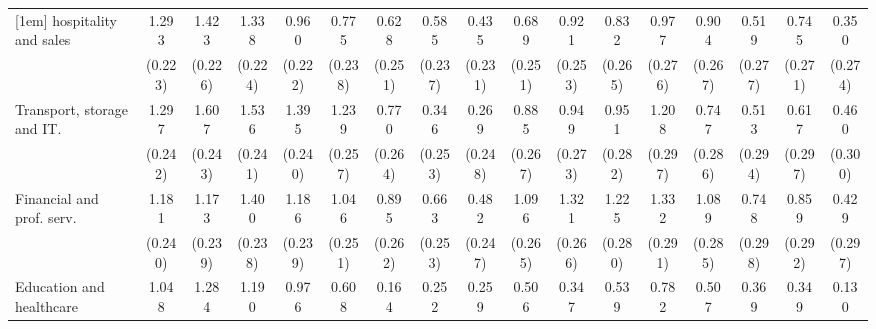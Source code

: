 {\begin{tabular}{l*{16}{c}}
[1em]
hospitality and sales&       1.293\sym{***}&       1.423\sym{***}&       1.338\sym{***}&       0.960\sym{***}&       0.775\sym{**} &       0.628\sym{*}  &       0.585\sym{*}  &       0.435         &       0.689\sym{**} &       0.921\sym{***}&       0.832\sym{**} &       0.977\sym{***}&       0.904\sym{***}&       0.519         &       0.745\sym{**} &       0.350         \\
                    &     (0.223)         &     (0.226)         &     (0.224)         &     (0.222)         &     (0.238)         &     (0.251)         &     (0.237)         &     (0.231)         &     (0.251)         &     (0.253)         &     (0.265)         &     (0.276)         &     (0.267)         &     (0.277)         &     (0.271)         &     (0.274)         \\
[1em]
Transport, storage and IT.&       1.297\sym{***}&       1.607\sym{***}&       1.536\sym{***}&       1.395\sym{***}&       1.239\sym{***}&       0.770\sym{**} &       0.346         &       0.269         &       0.885\sym{***}&       0.949\sym{***}&       0.951\sym{***}&       1.208\sym{***}&       0.747\sym{**} &       0.513         &       0.617\sym{*}  &       0.460         \\
                    &     (0.242)         &     (0.243)         &     (0.241)         &     (0.240)         &     (0.257)         &     (0.264)         &     (0.253)         &     (0.248)         &     (0.267)         &     (0.273)         &     (0.282)         &     (0.297)         &     (0.286)         &     (0.294)         &     (0.297)         &     (0.300)         \\
[1em]
Financial and prof. serv.&       1.181\sym{***}&       1.173\sym{***}&       1.400\sym{***}&       1.186\sym{***}&       1.046\sym{***}&       0.895\sym{***}&       0.663\sym{**} &       0.482         &       1.096\sym{***}&       1.321\sym{***}&       1.225\sym{***}&       1.332\sym{***}&       1.089\sym{***}&       0.748\sym{*}  &       0.859\sym{**} &       0.429         \\
                    &     (0.240)         &     (0.239)         &     (0.238)         &     (0.239)         &     (0.251)         &     (0.262)         &     (0.253)         &     (0.247)         &     (0.265)         &     (0.266)         &     (0.280)         &     (0.291)         &     (0.285)         &     (0.298)         &     (0.292)         &     (0.297)         \\
[1em]
Education and healthcare&       1.048\sym{***}&       1.284\sym{***}&       1.190\sym{***}&       0.976\sym{***}&       0.608\sym{*}  &       0.164         &       0.252         &       0.259         &       0.506         &       0.347         &       0.539         &       0.782\sym{*}  &       0.507         &       0.369         &       0.349         &       0.130         \\

\end{tabular}}
